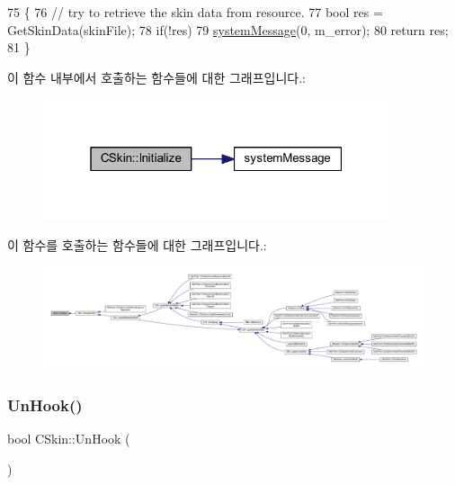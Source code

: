 \begin{DoxyCode}
75 \{
76   \textcolor{comment}{// try to retrieve the skin data from resource.}
77   \textcolor{keywordtype}{bool} res = GetSkinData(skinFile);
78   \textcolor{keywordflow}{if}(!res) 
79     \mbox{\hyperlink{system_8cpp_a747a9cb8e015a3d45cca636b5bd0fc69}{systemMessage}}(0, m\_error);
80   \textcolor{keywordflow}{return} res;
81 \}  
\end{DoxyCode}
이 함수 내부에서 호출하는 함수들에 대한 그래프입니다.\+:
\nopagebreak
\begin{figure}[H]
\begin{center}
\leavevmode
\includegraphics[width=289pt]{class_c_skin_ac9b8048b8c4a853574cc4c0f8b29827d_cgraph}
\end{center}
\end{figure}
이 함수를 호출하는 함수들에 대한 그래프입니다.\+:
\nopagebreak
\begin{figure}[H]
\begin{center}
\leavevmode
\includegraphics[width=350pt]{class_c_skin_ac9b8048b8c4a853574cc4c0f8b29827d_icgraph}
\end{center}
\end{figure}
\mbox{\label{class_c_skin_ab8237ed204df8eb4632ef3bc921783a3}} 
\subsubsection{\texorpdfstring{Un\+Hook()}{UnHook()}}
{\footnotesize\ttfamily bool C\+Skin\+::\+Un\+Hook (\begin{DoxyParamCaption}{ }\end{DoxyParamCaption})}



